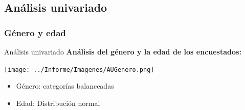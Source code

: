 \documentclass[pdf]{beamer}
\begin{document}
{%

\subsection{Análisis univariado}

    \subsubsection{Género y edad}

\begin{frame}{Análisis univariado}
    \textbf{Análisis del género y la edad de los encuestados:}  

    \begin{center}
        \texttt{[image: ../Informe/Imagenes/AUGenero.png]}
    \end{center}
    \begin{itemize}
        \item Género: categorías balanceadas
        \item Edad: Distribución normal
    \end{itemize}

\end{frame}
              


    
           


}
\end{document}
